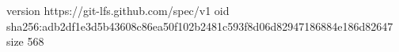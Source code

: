 version https://git-lfs.github.com/spec/v1
oid sha256:adb2df1e3d5b43608c86ea50f102b2481c593f8d06d82947186884e186d82647
size 568
